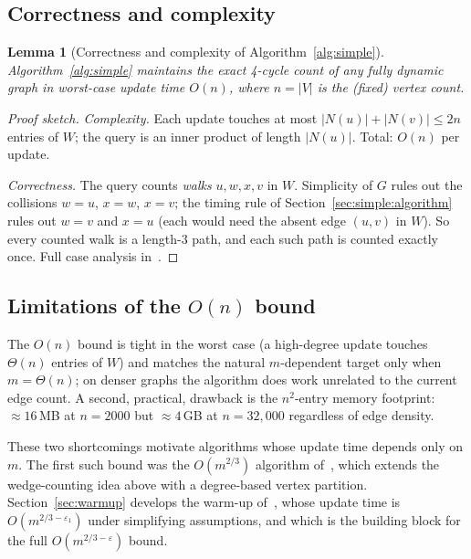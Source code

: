 \documentclass[sigconf,nonacm]{acmart}
\theoremstyle{plain}
\newtheorem{lemma}[theorem]{Lemma}
\theoremstyle{definition}
\begin{document}
\subsection{Correctness and complexity}
\label{sec:simple:proof}

\begin{lemma}[Correctness and complexity of Algorithm~\ref{alg:simple}]
\label{lem:simple}
Algorithm~\ref{alg:simple} maintains the exact 4-cycle count of any fully dynamic graph in worst-case update time $O(n)$, where $n = |V|$ is the (fixed) vertex count.
\end{lemma}

\begin{proof}[Proof sketch]
\emph{Complexity.} Each update touches at most $|N(u)| + |N(v)| \le 2n$ entries of $W$; the query is an inner product of length $|N(u)|$. Total: $O(n)$ per update.

\emph{Correctness.} The query counts \emph{walks} $u, w, x, v$ in $W$. Simplicity of $G$ rules out the collisions $w = u$, $x = w$, $x = v$; the timing rule of Section~\ref{sec:simple:algorithm} rules out $w = v$ and $x = u$ (each would need the absent edge $(u, v)$ in $W$). So every counted walk is a length-$3$ path, and each such path is counted exactly once. Full case analysis in~\cite[App.~A]{AssadiShah25}.
\end{proof}

\subsection{Limitations of the $O(n)$ bound}
\label{sec:simple:limitation}
The $O(n)$ bound is tight in the worst case (a high-degree update
touches $\Theta(n)$ entries of $W$) and matches the natural
$m$-dependent target only when $m = \Theta(n)$; on denser graphs
the algorithm does work unrelated to the current edge count. A
second, practical, drawback is the $n^2$-entry memory footprint:
$\approx 16$\,MB at $n = 2000$ but $\approx 4$\,GB at
$n = 32{,}000$ regardless of edge density.

These two shortcomings motivate algorithms whose update time
depends only on $m$. The first such bound was the $O(m^{2/3})$
algorithm of~\cite{HHH22}, which extends the wedge-counting idea
above with a degree-based vertex partition.
Section~\ref{sec:warmup} develops the warm-up
of~\cite{AssadiShah25}, whose update time is
$O(m^{2/3-\varepsilon_1})$ under simplifying assumptions, and which
is the building block for the full $O(m^{2/3-\varepsilon})$ bound.
\end{document}
